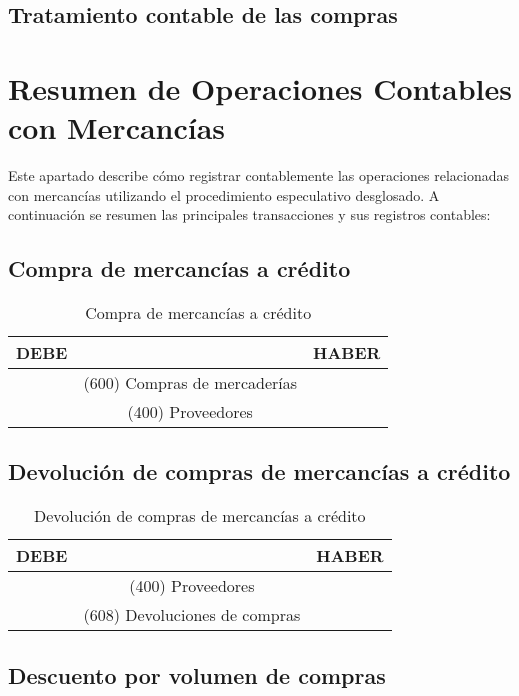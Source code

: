 \documentclass{article}
\begin{document}
\subsection{Tratamiento contable de las compras}

    
\section*{Resumen de Operaciones Contables con Mercancías}

Este apartado describe cómo registrar contablemente las operaciones relacionadas con mercancías utilizando el procedimiento especulativo desglosado. A continuación se resumen las principales transacciones y sus registros contables:

\subsection*{Compra de mercancías a crédito}

\begin{table}[H]
\centering
\begin{tabular}{|c|c|c|}
\hline
\textbf{DEBE} & \textbf{} & \textbf{HABER} \\
\hline
\textbf{} & (600) Compras de mercaderías & \textbf{} \\
\hline
\textbf{} & (400) Proveedores & \textbf{} \\
\hline
\end{tabular}
\caption{Compra de mercancías a crédito}
\end{table}

\subsection*{Devolución de compras de mercancías a crédito}


\begin{table}[H]
\centering
\begin{tabular}{|c|c|c|}
\hline
\textbf{DEBE} & \textbf{} & \textbf{HABER} \\
\hline
\textbf{} & (400) Proveedores & \textbf{} \\
\hline
\textbf{} & (608) Devoluciones de compras & \textbf{} \\
\hline
\end{tabular}
\caption{Devolución de compras de mercancías a crédito}
\end{table}

\subsection*{Descuento por volumen de compras}
\end{document}
